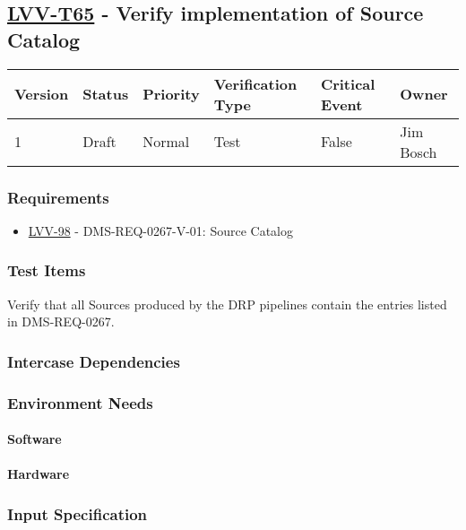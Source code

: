 \subsection{\href{https://jira.lsstcorp.org/secure/Tests.jspa\#/testCase/LVV-T65}{LVV-T65}
    - Verify implementation of Source Catalog}\label{lvv-t65}

\begin{longtable}[]{llllll}
\toprule
Version & Status & Priority & Verification Type & Critical Event & Owner
\\\midrule
1 & Draft & Normal &
Test & False & Jim Bosch
\\\bottomrule
\end{longtable}

\subsubsection{Requirements}
\begin{itemize}
\item \href{https://jira.lsstcorp.org/browse/LVV-98}{LVV-98} - DMS-REQ-0267-V-01: Source Catalog
\end{itemize}

\subsubsection{Test Items}
Verify that all Sources produced by the DRP pipelines contain the
entries listed in DMS-REQ-0267.



\subsubsection{Intercase Dependencies}

\subsubsection{Environment Needs}

\paragraph{Software}

\paragraph{Hardware}

\subsubsection{Input Specification}

